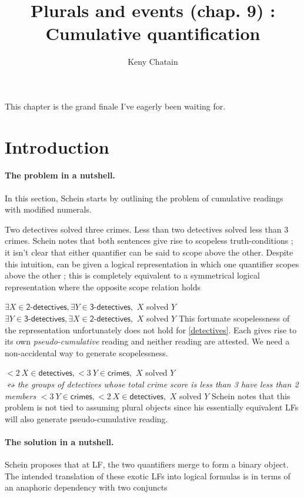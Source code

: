 \documentclass[english]{article}
\title{Plurals and events (chap. 9) : Cumulative quantification}
\author{Keny Chatain}
\begin{document}
\maketitle

This chapter is the grand finale I've eagerly been waiting for.

\section{Introduction}

\paragraph{The problem in a nutshell.}

In this section, Schein starts by outlining the problem of cumulative readings with modified numerals.

\pex
\a
Two detectives solved three crimes.
\a 
Less than two detectives solved less than 3 crimes. \label{detectives}
\xe
%
Schein notes that both sentences give rise to scopeless truth-conditions ; it isn't clear that either quantifier can be said to scope above the other. Despite this intuition, \clastxa can be given a logical representation in which one quantifier scopes above the other \cnextxa ; this is completely equivalent to a symmetrical logical representation where the opposite scope relation holds \cnextxb

\pex
\a 
$\exists X\in \textsf{2-detectives}, \exists Y\in \textsf{3-detectives},$ $X$ solved $Y$
\a
$\exists Y\in \textsf{3-detectives}, \exists X\in \textsf{2-detectives},$ $X$ solved $Y$
\xe
%
This fortunate scopelessness of the representation unfortunately does not hold for \cref{detectives}. Each gives rise to its own \emph{pseudo-cumulative} reading and neither reading are attested. We need a non-accidental way to generate scopelessness.

\pex
\a 
$<2\ X \in\textsf{detectives}, <3\ Y \in\textsf{crimes},$ $X$ solved $Y$\\
$\leftrightsquigarrow$\emph{the groups of detectives whose total crime score is less than 3 have less than 2 members}
\a 
$<3\ Y \in\textsf{crimes}, <2\ X \in\textsf{detectives}, $ $X$ solved $Y$
\xe
%
 Schein notes that this problem is not tied to assuming plural objects since his essentially equivalent LFs will also generate pseudo-cumulative reading.

\paragraph{The solution in a nutshell.} Schein proposes that at LF, the two quantifiers merge to form a binary object. The intended translation of these exotic LFs into logical formulas is in terms of an anaphoric dependency with two conjuncts
\end{document}
